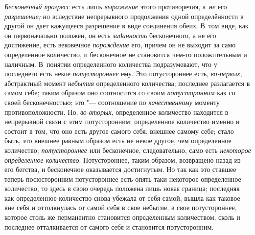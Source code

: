 {\em Бесконечный прогресс} есть лишь {\em выражение} этого противоречия,
а~{\em не} его {\em разрешение;} но вследствие непрерывного продолжения одной
определённости в другой он дает кажущееся разрешение в виде соединения обеих. В~том
виде, как он первоначально положен, он есть {\em заданность}
бесконечного, а не его достижение, есть вековечное {\em порождение} его, причем
он не выходит за само определенное количество, и бесконечное не становится
чем-то положительным и наличным. В~понятии определенного количества
подразумевают, что у последнего есть некое {\em потустороннее} ему. Это
потустороннее есть, {\em во-первых}, абстрактный момент {\em небытия}
определенного количества; последнее разлагается в самом себе; таким образом оно
соотносится со своим {\em потусторонним} как со своей бесконечностью; это "---
соотношение по {\em качественному} моменту противоположности. Но,
{\em во-вторых}, определенное количество находится в непрерывной связи с этим
потусторонним; определенное количество именно и состоит в том, что оно есть
другое самого себя, внешнее самому себе; стало быть, это внешнее равным образом
есть не некое другое, чем определенное количество; {\em потустороннее} или
бесконечное, следовательно, само есть {\em некоторое определенное количество}.
Потустороннее, таким образом, возвращено назад из его бегства, и бесконечное
оказывается достигнутым. Но так как это ставшее теперь посюсторонним
потустороннее есть опять-таки некоторое определенное количество, то здесь
в свою очередь положена лишь новая граница; последняя как определенное
количество снова убежала от себя самой, вышла как таковое вне себя и
оттолкнулась от самой себя в свое небытие, в свое потустороннее, которое столь
же перманентно становится определенным количеством, сколь и последнее
отталкивается от самого себя и становится потусторонним.

